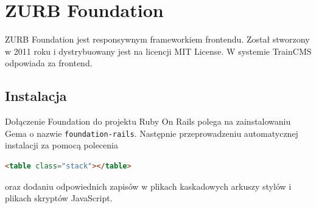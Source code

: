 \documentclass[openright]{xmgr}
\begin{document}
\newpage

\section{ZURB Foundation}
ZURB Foundation \cite{foundation} jest responsywnym frameworkiem frontendu. Został stworzony w 2011 roku i dystrybuowany jest na licencji MIT License. W systemie \mbox{TrainCMS} odpowiada za frontend. 

\subsection{Instalacja}
Dołączenie Foundation do projektu Ruby On Rails polega na zainstalowaniu Gema o nazwie \texttt{foundation-rails}. Następnie przeprowadzeniu automatycznej instalacji za pomocą polecenia 
\begin{lstlisting}[language=html, caption={Przykładowa tabela}]
<table class="stack"></table>
\end{lstlisting}
oraz dodaniu odpowiednich zapisów w plikach kaskadowych arkuszy stylów i plikach skryptów JavaScript.
\end{document}
